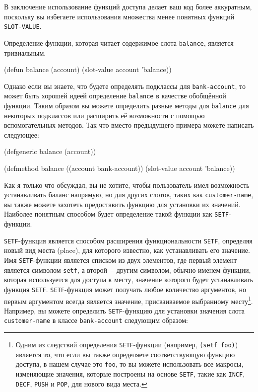 В заключение использование функций доступа делает ваш код более аккуратным, поскольку вы
избегаете использования множества менее понятных функций \lstinline{SLOT-VALUE}.

Определение функции, которая читает содержимое слота \lstinline{balance}, является тривиальным.

\begin{myverb}
(defun balance (account)
  (slot-value account 'balance))
\end{myverb}

Однако если вы знаете, что будете определять подклассы для \lstinline{bank-account}, то
может быть хорошей идеей определение \lstinline{balance} в качестве обобщённой функции.  Таким
образом вы можете определить разные методы для \lstinline{balance} для некоторых подклассов
или расширить её возможности с помощью вспомогательных методов. Так что вместо предыдущего
примера можете написать следующее:

\begin{myverb}
(defgeneric balance (account))

(defmethod balance ((account bank-account))
  (slot-value account 'balance))
\end{myverb}

Как я только что обсуждал, вы не хотите, чтобы пользователь имел возможность устанавливать
баланс напрямую, но для других слотов, таких как \lstinline{customer-name}, вы также можете
захотеть предоставить функцию для установки их значений.  Наиболее понятным способом будет
определение такой функции как \lstinline{SETF}-функции.

\lstinline{SETF}-функция является способом расширения функциональности \lstinline{SETF}, определяя
новый вид места (place), для которого известно, как устанавливать его значение.  Имя
\lstinline{SETF}-функции является списком из двух элементов, где первый элемент является
символом \lstinline{setf}, а второй~-- другим символом, обычно именем функции, которая
используется для доступа к месту, значение которого будет устанавливать функция
\lstinline{SETF}.  \lstinline{SETF}-функция может получать любое количество аргументов, но первым
аргументом всегда является значение, присваиваемое выбранному месту\footnote{Одним из
  следствий определения \lstinline{SETF}-функции (например, \lstinline{(setf foo)}) является то, что
  если вы также определяете соответствующую функцию доступа, в нашем случае это
  \lstinline{foo}, то вы можете использовать все макросы, изменяющие значения, которые построены
  на основе \lstinline{SETF}, такие как \lstinline{INCF}, \lstinline{DECF}, \lstinline{PUSH} и \lstinline{POP}, для
  нового вида места.}.  Например, вы можете определить \lstinline{SETF}-функцию для установки
значения слота \lstinline{customer-name} в классе \lstinline{bank-account} следующим образом:

